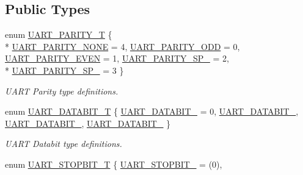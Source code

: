 \subsection*{Public Types}
\begin{DoxyCompactItemize}
\item 
enum \hyperlink{class_c_serial_ad38b0926868c6cfabb59e2da94f1cf40}{U\-A\-R\-T\-\_\-\-P\-A\-R\-I\-T\-Y\-\_\-\-T} \{ \\*
\hyperlink{class_c_serial_ad38b0926868c6cfabb59e2da94f1cf40a77e567bbd57497e51b0161ed1cd855a4}{U\-A\-R\-T\-\_\-\-P\-A\-R\-I\-T\-Y\-\_\-\-N\-O\-N\-E} = 4, 
\hyperlink{class_c_serial_ad38b0926868c6cfabb59e2da94f1cf40aa157a4ef710e04651e3aaf61a4d96ad9}{U\-A\-R\-T\-\_\-\-P\-A\-R\-I\-T\-Y\-\_\-\-O\-D\-D} = 0, 
\hyperlink{class_c_serial_ad38b0926868c6cfabb59e2da94f1cf40a4b7452e8ef848287eca86b7ea4411e65}{U\-A\-R\-T\-\_\-\-P\-A\-R\-I\-T\-Y\-\_\-\-E\-V\-E\-N} = 1, 
\hyperlink{class_c_serial_ad38b0926868c6cfabb59e2da94f1cf40a20c9bc3b3fa95b78898159cd2680e007}{U\-A\-R\-T\-\_\-\-P\-A\-R\-I\-T\-Y\-\_\-\-S\-P\-\_} = 2, 
\\*
\hyperlink{class_c_serial_ad38b0926868c6cfabb59e2da94f1cf40a660aab6ba15f9c94cc9963ff226a77eb}{U\-A\-R\-T\-\_\-\-P\-A\-R\-I\-T\-Y\-\_\-\-S\-P\-\_} = 3
 \}
\begin{DoxyCompactList}\small\item\em U\-A\-R\-T Parity type definitions. \end{DoxyCompactList}\item 
enum \hyperlink{class_c_serial_a628c8c9be04f0315c4dae70ce8ccc5b3}{U\-A\-R\-T\-\_\-\-D\-A\-T\-A\-B\-I\-T\-\_\-\-T} \{ \hyperlink{class_c_serial_a628c8c9be04f0315c4dae70ce8ccc5b3a7ac317a766becd83f58a2daa007fed1e}{U\-A\-R\-T\-\_\-\-D\-A\-T\-A\-B\-I\-T\-\_} = 0, 
\hyperlink{class_c_serial_a628c8c9be04f0315c4dae70ce8ccc5b3a6c31f7e06c7a6779b6d72d37aba52fb1}{U\-A\-R\-T\-\_\-\-D\-A\-T\-A\-B\-I\-T\-\_}, 
\hyperlink{class_c_serial_a628c8c9be04f0315c4dae70ce8ccc5b3abf533a46435efaddb8e38b9b9fe53eff}{U\-A\-R\-T\-\_\-\-D\-A\-T\-A\-B\-I\-T\-\_}, 
\hyperlink{class_c_serial_a628c8c9be04f0315c4dae70ce8ccc5b3a196b716ca31d23301c1059b53ac35f25}{U\-A\-R\-T\-\_\-\-D\-A\-T\-A\-B\-I\-T\-\_}
 \}
\begin{DoxyCompactList}\small\item\em U\-A\-R\-T Databit type definitions. \end{DoxyCompactList}\item 
enum \hyperlink{class_c_serial_af02af389f5596b7b40cf0d2ece57b04b}{U\-A\-R\-T\-\_\-\-S\-T\-O\-P\-B\-I\-T\-\_\-\-T} \{ \hyperlink{class_c_serial_af02af389f5596b7b40cf0d2ece57b04ba6351eeac6c2e865ed9019323e2491907}{U\-A\-R\-T\-\_\-\-S\-T\-O\-P\-B\-I\-T\-\_} = (0), 

\end{DoxyCompactItemize}

